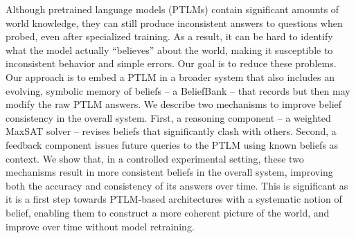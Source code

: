 Although pretrained language models (PTLMs) contain significant amounts of world knowledge, they can still produce inconsistent answers to questions when probed, even after specialized training.  As a result, it can be hard to identify what the model actually ``believes'' about the world, making it susceptible to inconsistent behavior and simple errors. Our goal is to reduce these problems. Our approach is to embed a PTLM in a broader system that also includes an evolving, symbolic memory of beliefs -- a BeliefBank --  that records but then may modify the raw PTLM answers. We describe two mechanisms to improve belief consistency in the overall system. First, a reasoning component -- a weighted MaxSAT solver -- revises beliefs that significantly clash with others. Second, a feedback component issues future queries to the PTLM using known beliefs as context. We show that, in a controlled experimental setting, these two mechanisms result in more consistent beliefs in the overall system, improving both the accuracy and consistency of its answers over time. This is significant as it is a first step towards PTLM-based architectures with a systematic notion of belief, enabling them to construct a more coherent picture of the world, and improve over time without model retraining.
